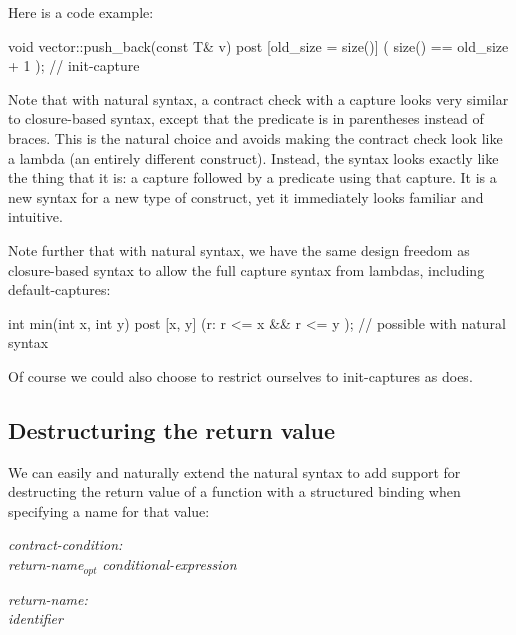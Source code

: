 Here is a code example:

\begin{codeblock}
void vector::push_back(const T& v)
  post [old_size = size()] ( size() == old_size + 1 );  // init-capture
\end{codeblock}

Note that with natural syntax, a contract check with a capture looks very similar to closure-based syntax, except that the predicate is in parentheses instead of braces. This is the natural choice and avoids making the contract check look like a lambda (an entirely different construct). Instead, the syntax looks exactly like the thing that it is: a capture followed by a predicate using that capture. It is a new syntax for a new type of construct, yet it immediately looks familiar and intuitive.

Note further that with natural syntax, we have the same design freedom as closure-based syntax \cite{P2461R1} to allow the full capture syntax from lambdas, including default-captures:

\begin{codeblock}
int min(int x, int y)
  post [x, y] (r: r <= x && r <= y );   // possible with natural syntax
\end{codeblock}

Of course we could also choose to restrict ourselves to init-captures as \cite{P2935R3} does. 


\subsection{Destructuring the return value}
\label{subsec:struct}

We can easily and naturally extend the natural syntax to add support for destructing the return value of a function with a structured binding when specifying a name for that value:

\emph{contract-condition:} \\
\phantom{~~~}\tcode{(} \emph{return-name}$_{opt}$ \emph{conditional-expression} \tcode{)}

\emph{return-name:}\\
\phantom{~~~}\emph{identifier} \tcode{:} \\
\phantom{~~~}

